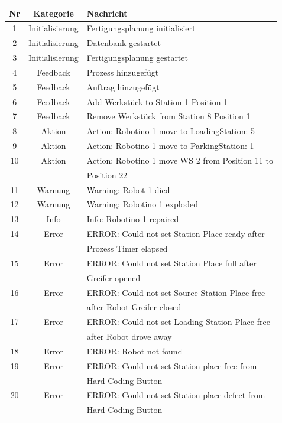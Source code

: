 \begin{table}[!ht]
	\centering
	\begin{tabular}{|c|c|l|}
		\hline
		Nr & Kategorie &	Nachricht \\
		\hline
    1  & Initialisierung & Fertigungsplanung initialisiert \\
    2  & Initialisierung & Datenbank gestartet \\
    3  & Initialisierung & Fertigungsplanung gestartet \\
 		\hline
    4  & Feedback & Prozess hinzugefügt \\
    5  & Feedback & Auftrag hinzugefügt \\
    6  & Feedback & Add Werkstück to Station 1 Position 1 \\
    7  & Feedback & Remove Werkstück from Station 8 Position 1 \\
 		\hline
    8  & Aktion & Action: Robotino 1 move to LoadingStation: 5 \\
    9  & Aktion & Action: Robotino 1 move to ParkingStation: 1 \\
    10 & Aktion & Action: Robotino 1 move WS 2 from Position 11 to \\ && Position 22 \\
 		\hline
    11 & Warnung & Warning: Robot 1 died \\
    12 & Warnung & Warning: Robotino 1 exploded \\
    13 & Info & Info: Robotino 1 repaired \\
		\hline
    14 & Error & ERROR: Could not set Station Place ready after \\ && Prozess Timer elapsed \\
    15 & Error & ERROR: Could not set Station Place full after \\ && Greifer opened \\
    16 & Error & ERROR: Could not set Source Station Place free \\ && after Robot Greifer closed \\
    17 & Error & ERROR: Could not set Loading Station Place free \\ && after Robot drove away \\
    18 & Error & ERROR: Robot not found \\
    19 & Error & ERROR: Could not set Station place free from \\ && Hard Coding Button \\
    20 & Error & ERROR: Could not set Station place defect from \\ && Hard Coding Button \\

\end{tabular}
\end{table}
